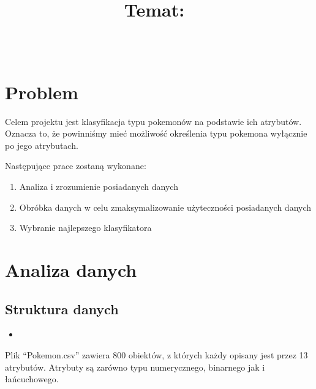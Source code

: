 \documentclass{article}
\title{
\vspace{2in}
\textmd{\textbf{\hmwkClass\ \hmwkTitle}}\\
\normalsize\vspace{0.1in}\small{Temat:\ \hmwkDueDate}\\
\vspace{0.1in}\large{\textit{\hmwkClassInstructor\ \hmwkClassTime}}
\vspace{3in}
}
\author{\textbf{\hmwkAuthorName}}
\date{} %
\newcommand{\rscript}[2]{
\begin{itemize}
\item[]
\end{itemize}
}
\begin{document}
\maketitle



\newpage
\tableofcontents
\newpage



\section{Problem}

Celem projektu jest klasyfikacja typu pokemonów na podstawie ich atrybutów. Oznacza to, że powinniśmy mieć możliwość określenia typu pokemona wyłącznie po jego atrybutach. 

Następujące prace zostaną wykonane:
\begin{enumerate}
	\item Analiza i zrozumienie posiadanych danych
	\item Obróbka danych w celu zmaksymalizowanie użyteczności posiadanych danych
	\item Wybranie najlepszego klasyfikatora
\end{enumerate}

\section{Analiza danych}

\subsection{Struktura danych}
\rscript{str}{Struktura danych}

Plik ``Pokemon.csv'' zawiera 800 obiektów, z których każdy opisany jest przez 13 atrybutów. Atrybuty są zarówno typu numerycznego, binarnego jak i łańcuchowego. 
\end{document}
